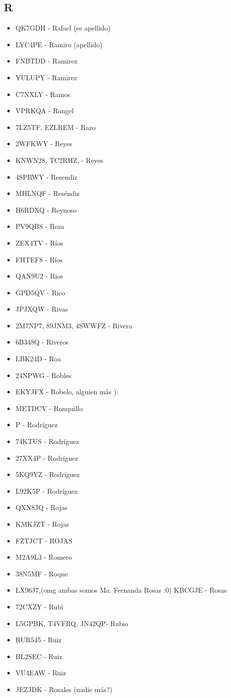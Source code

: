 \subsection*{R}
\begin{itemize}[leftmargin=*,nosep]
\item QK7GDH - Rafael (es apellido)
\item LYC4PE - Ramiro (apellido)
\item FNBTDD - Ramirez
\item YULUPY - Ramirez
\item C7NXLY  -  Ramos
\item VPRKQA -  Rangel
\item 7LZ5TF, EZLREM - Razo
\item 2WFKWY  -  Reyes
\item KNWN28, TC2RHZ, - Reyes
\item 4SPRWY - Resendiz
\item MHLNQF - Reséndiz
\item H6RDXQ - Reynoso
\item PV9QBS - Reza
\item ZEX4TV  -  Ríos
\item FHTEF8 - Ríos
\item QAN9U2 - Rios
\item GPD5QV - Rico
\item JPJXQW - Rivas
\item 2M7NP7, 89JNM3, 4SWWFZ -  Rivera
\item 6B348Q - Riveros
\item LBK24D - Roa
\item 24NPWG - Robles
\item EKYJFX - Robelo, alguien más ):
\item METDCV - Ronquillo
\item P  -  Rodríguez
\item 74KTUS - Rodríguez
\item 27XX4P  -  Rodríguez
\item 5KQ9YZ - Rodríguez
\item L92K5P - Rodríguez
\item QXN8JQ - Rojas
\item KMKJZT  -  Rojas
\item FZTJCT - ROJAS
\item M2A9L3  -  Romero
\item 38N5MF  -  Roque
\item LX96J7,(omg ambas somos Ma. Fernanda Rosas :0) KBCGJE  -  Rosas
\item 72CXZY - Rubi
\item L5GPBK, T4VFRQ, JN42QP-  Rubio
\item RUR545  -  Ruiz
\item BL2SEC - Ruiz
\item VU4EAW  -  Ruiz
\item JEZJDK - Rosales (nadie más?)
\end{itemize}

